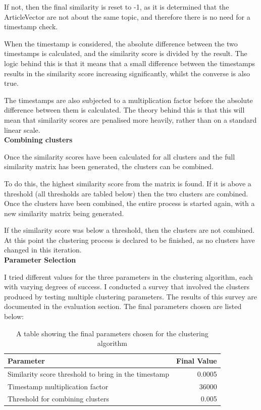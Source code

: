 \documentclass[12pt]{article}
\begin{document}
If not, then the final similarity is reset to -1, as it is determined that the ArticleVector are not about the same topic, and therefore there is no need for a timestamp check.

When the timestamp is considered, the absolute difference between the two timestamps is calculated, and the similarity score is divided by the result. The logic behind this is that it means that a small difference between the timestamps results in the similarity score increasing significantly, whilst the converse is also true.

The timestamps are also subjected to a multiplication factor before the absolute difference between them is calculated. The theory behind this is that this will mean that similarity scores are penalised more heavily, rather than on a standard linear scale. \\

\textbf{Combining clusters}

Once the similarity scores have been calculated for all clusters and the full similarity matrix has been generated, the clusters can be combined.

To do this, the highest similarity score from the matrix is found. If it is above a threshold (all thresholds are tabled below) then the two clusters are combined. Once the clusters have been combined, the entire process is started again, with a new similarity matrix being generated.

If the similarity score was below a threshold, then the clusters are not combined. At this point the clustering process is declared to be finished, as no clusters have changed in this iteration. \\

\textbf{Parameter Selection}

I tried different values for the three parameters in the clustering algorithm, each with varying degrees of success. I conducted a survey that involved the clusters produced by testing multiple clustering parameters. The results of this survey are documented in the evaluation section. The final parameters chosen are listed below:

\begin{table}[H]
	\centering
	\begin{tabular}{l|r}
		\textbf{Parameter} & \textbf{Final Value} \\ \hline
		Similarity score threshold to bring in the timestamp & 0.0005 \\ \hline
		Timestamp multiplication factor & 36000 \\ \hline
		Threshold for combining clusters &  0.005 \\ \hline
	\end{tabular}
	\caption[Parameters for the clustering algorithn]{A table showing the final parameters chosen for the clustering algorithm}
	\label{clusteringparameters}
\end{table}
\end{document}

